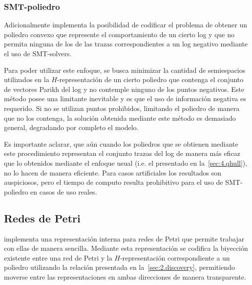\subsubsection{SMT-poliedro}
\label{sec:4.smthull}

Adicionalmente \pachtool implementa la posibilidad de codificar el problema de obtener un 
poliedro convexo que represente el comportamiento de un cierto log y que no permita ninguna de los 
de las trazas correspondientes a un log negativo mediante el uso de SMT-solvers.

Para poder utilizar este enfoque, se busca minimizar la cantidad de semiespacios utilizados
en la $H$-representación de un cierto poliedro que contenga el conjunto de vectores Parikh
del log y no contemple ninguno de los puntos negativos.
Este método posee una limitante inevitable y es que el uso de información negativa es requerido.
Si no se utilizan puntos prohibidos, limitando el poliedro de manera que no los contenga,
la solución obtenida mediante este método es demasiado general, degradando por completo el modelo.

Es importante aclarar, que aún cuando los poliedros que se obtienen mediante este procedimiento 
representan el conjunto trazas del log de manera más eficaz que lo obtenidos mediante el 
enfoque usual (i.e. el presentado en la~\autoref{sec:4.qhull}), no lo hacen de manera eficiente.
Para casos artificiales los resultados son auspiciosos, pero el tiempo de computo
resulta prohibitivo para el uso de SMT-poliedro en casos de uso reales.

\subsection{Redes de Petri}
\label{sec:4.petri}

\pachtool implementa una representación interna para redes de Petri que permite trabajar con ellas de manera sencilla.
Mediante esta representación se codifica la biyección existente entre una red de Petri y la $H$-representación 
correspondiente a un poliedro utilizando la relación presentada en la~\autoref{sec:2.discovery}, permitiendo
moverse entre las representaciones en ambas direcciones de manera transparente.

